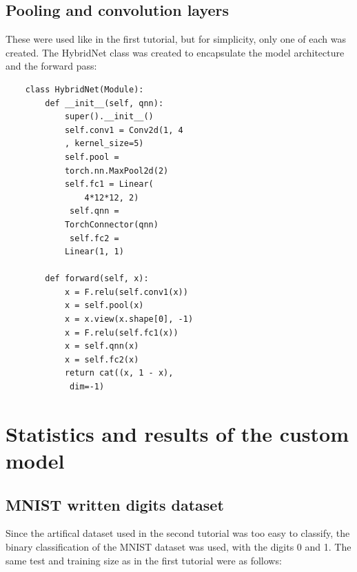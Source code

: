\documentclass[conference]{IEEEtran}
\begin{document}
\subsection*{\fontsize{12}{16}\selectfont Pooling and convolution layers}
\noindent
These were used like in the first tutorial, but for simplicity, only one of each was created. The HybridNet class was created to encapsulate the model architecture and the forward pass:

{\small
\begin{verbatim}
    class HybridNet(Module):
        def __init__(self, qnn):
            super().__init__()
            self.conv1 = Conv2d(1, 4
            , kernel_size=5)  
            self.pool = 
            torch.nn.MaxPool2d(2)         
            self.fc1 = Linear(
                4*12*12, 2)              
             self.qnn = 
            TorchConnector(qnn)          
             self.fc2 = 
            Linear(1, 1)    

        def forward(self, x):
            x = F.relu(self.conv1(x))
            x = self.pool(x)
            x = x.view(x.shape[0], -1)
            x = F.relu(self.fc1(x))
            x = self.qnn(x)
            x = self.fc2(x)
            return cat((x, 1 - x),
             dim=-1)
\end{verbatim}}


\section*{\fontsize{16}{20}\selectfont Statistics and results of the custom model}

\subsection*{\fontsize{12}{16}\selectfont MNIST written digits dataset}


\noindent
Since the artifical dataset used in the second tutorial was too easy to classify, the binary classification of the MNIST dataset was used, with the digits 0 and 1. The same test and training size as in the first tutorial were as follows:
\end{document}
